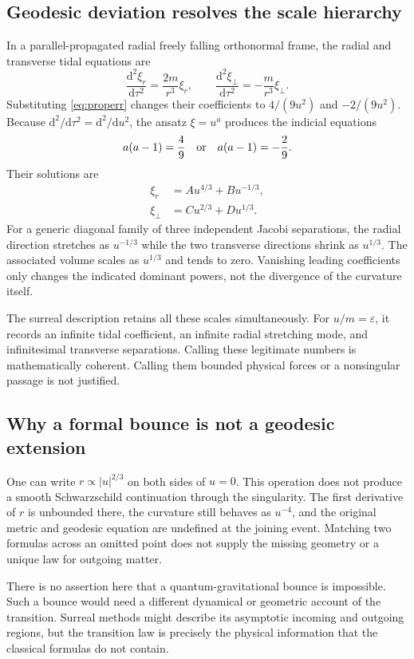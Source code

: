 \documentclass[11pt,a4paper]{article}
\numberwithin{equation}{section}
\theoremstyle{definition}
\theoremstyle{remark}
\newcommand{\dd}{\mathrm d}
\begin{document}
\subsection{Geodesic deviation resolves the scale hierarchy}
In a parallel-propagated radial freely falling orthonormal frame, the radial
and transverse tidal equations are
\begin{equation}\label{eq:jacobi}
\frac{\dd^2\xi_r}{\dd\tau^2}=\frac{2m}{r^3}\xi_r,
\qquad
\frac{\dd^2\xi_\perp}{\dd\tau^2}=-\frac{m}{r^3}\xi_\perp.
\end{equation}
Substituting \eqref{eq:properr} changes their coefficients to
$4/(9u^2)$ and $-2/(9u^2)$. Because
$\dd^2/\dd\tau^2=\dd^2/\dd u^2$, the ansatz $\xi=u^a$ produces the
indicial equations
\[
a(a-1)=\frac49\quad\hbox{or}\quad a(a-1)=-\frac29.
\]
Their solutions are
\begin{align}
\xi_r&=A u^{4/3}+B u^{-1/3},\label{eq:radmodes}\\
\xi_\perp&=C u^{2/3}+D u^{1/3}.\label{eq:transmodes}
\end{align}
For a generic diagonal family of three independent Jacobi separations, the
radial direction stretches as $u^{-1/3}$ while the two transverse directions
shrink as $u^{1/3}$. The associated volume scales as $u^{1/3}$ and tends to
zero. Vanishing leading coefficients only changes the indicated dominant
powers, not the divergence of the curvature itself.

The surreal description retains all these scales simultaneously. For
$u/m=\varepsilon$, it records an infinite tidal coefficient, an infinite radial
stretching mode, and infinitesimal transverse separations. Calling these
legitimate numbers is mathematically coherent. Calling them bounded physical
forces or a nonsingular passage is not justified.

\subsection{Why a formal bounce is not a geodesic extension}
One can write $r\propto |u|^{2/3}$ on both sides of $u=0$. This operation does
not produce a smooth Schwarzschild continuation through the singularity. The
first derivative of $r$ is unbounded there, the curvature still behaves as
$u^{-4}$, and the original metric and geodesic equation are undefined at the
joining event. Matching two formulas across an omitted point does not supply
the missing geometry or a unique law for outgoing matter.

There is no assertion here that a quantum-gravitational bounce is impossible.
Such a bounce would need a different dynamical or geometric account of the
transition. Surreal methods might describe its asymptotic incoming and outgoing
regions, but the transition law is precisely the physical information that the
classical formulas do not contain.
\end{document}
